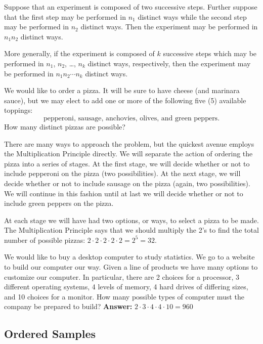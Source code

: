 \begin{prop}
Suppose that an experiment is composed of two successive
steps. Further suppose that the first step may be performed in
\(n_{1}\) distinct ways while the second step may be performed in
\(n_{2}\) distinct ways. Then the experiment may be performed in
\(n_{1}n_{2}\) distinct ways.

More generally, if the experiment is composed of \(k\) successive
steps which may be performed in \(n_{1}\), \(n_{2}\), \ldots{}, \(n_{k}\)
distinct ways, respectively, then the experiment may be performed in
\(n_{1} n_{2} \cdots n_{k}\) distinct ways.
\end{prop}


We would like to order a pizza. It will be sure to have cheese (and
marinara sauce), but we may elect to add one or more of the following
five (5) available toppings: \[ \mbox{pepperoni, sausage, anchovies,
olives, and green peppers.}  \] How many distinct pizzas are possible?

There are many ways to approach the problem, but the quickest avenue
employs the Multiplication Principle directly. We will separate the
action of ordering the pizza into a series of stages. At the first
stage, we will decide whether or not to include pepperoni on the pizza
(two possibilities). At the next stage, we will decide whether or not
to include sausage on the pizza (again, two possibilities). We will
continue in this fashion until at last we will decide whether or not
to include green peppers on the pizza.

At each stage we will have had two options, or ways, to select a pizza
to be made. The Multiplication Principle says that we should multiply
the 2's to find the total number of possible pizzas: \(2 \cdot 2 \cdot
2 \cdot 2 \cdot 2 = 2^{5} = 32\).




We would like to buy a desktop computer to study statistics. We go to
a website to build our computer our way. Given a line of products we
have many options to customize our computer. In particular, there are
2 choices for a processor, 3 different operating systems, 4 levels of
memory, 4 hard drives of differing sizes, and 10 choices for a
monitor. How many possible types of computer must the company be
prepared to build? \textbf{Answer:} \(2 \cdot 3 \cdot 4 \cdot 4 \cdot 10 = 960\)

\subsection{Ordered Samples}
\label{sec-4-5-1}

